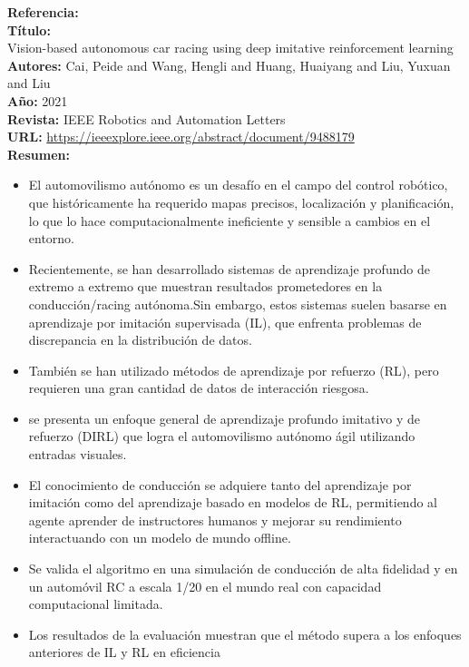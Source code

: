 \documentclass[10pt,letterpaper,final]{article}
\begin{document}
\begin{longtable}
        \hline
        \noindent \textbf{Referencia:}~\cite{althoff2009model} \\
        \textbf{Título:} \\
        Vision-based autonomous car racing using deep imitative reinforcement learning \\
        \textbf{Autores:}
        Cai, Peide and Wang, Hengli and Huang, Huaiyang and Liu, Yuxuan and Liu \\
        \textbf{Año:}
        2021 \\
        \textbf{Revista:}
        IEEE Robotics and Automation Letters \\
        \textbf{URL:}
        \url{https://ieeexplore.ieee.org/abstract/document/9488179} \\
        \textbf{Resumen:}
        \begin{itemize}
            \item El automovilismo autónomo es un desafío en el campo del control robótico, que históricamente ha requerido mapas precisos,
            localización y planificación, lo que lo hace computacionalmente ineficiente y sensible a cambios en el entorno.
            \item  Recientemente, se han desarrollado sistemas de aprendizaje profundo de extremo a extremo que muestran resultados prometedores
            en la conducción/racing autónoma.Sin embargo, estos sistemas suelen basarse en aprendizaje por imitación supervisada (IL),
            que enfrenta problemas de discrepancia en la distribución de datos.
            \item También se han utilizado métodos de aprendizaje por refuerzo (RL), pero requieren una gran cantidad de datos de interacción riesgosa.
            \item se presenta un enfoque general de aprendizaje profundo imitativo y de refuerzo (DIRL) que logra el automovilismo
            autónomo ágil utilizando entradas visuales.
            \item El conocimiento de conducción se adquiere tanto del aprendizaje por imitación como del aprendizaje basado en modelos de RL,
            permitiendo al agente aprender de instructores humanos y mejorar su rendimiento interactuando con un modelo de mundo offline.
            \item Se valida el algoritmo en una simulación de conducción de alta fidelidad y en un automóvil RC a escala 1/20
            en el mundo real con capacidad computacional limitada.
            \item  Los resultados de la evaluación muestran que el método supera a los enfoques anteriores de IL y RL en eficiencia

\end{itemize}
\end{longtable}
\end{document}
